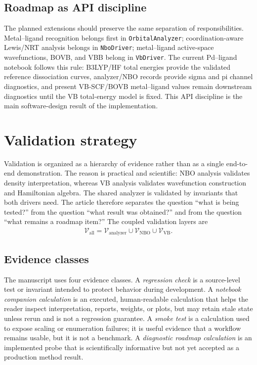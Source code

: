 \documentclass[11pt]{article}
\begin{document}
\subsection{Roadmap as API discipline}

The planned extensions should preserve the same separation of responsibilities.  Metal--ligand recognition belongs first in \texttt{OrbitalAnalyzer}; coordination-aware Lewis/NRT analysis belongs in \texttt{NboDriver}; metal--ligand active-space wavefunctions, BOVB, and VBB belong in \texttt{VbDriver}.  The current Pd--ligand notebook follows this rule: B3LYP/HF total energies provide the validated reference dissociation curves, analyzer/NBO records provide sigma and pi channel diagnostics, and present VB-SCF/BOVB metal--ligand values remain downstream diagnostics until the VB total-energy model is fixed.  This API discipline is the main software-design result of the implementation.

\section{Validation strategy}

Validation is organized as a hierarchy of evidence rather than as a single end-to-end demonstration.  The reason is practical and scientific: NBO analysis validates density interpretation, whereas VB analysis validates wavefunction construction and Hamiltonian algebra.  The shared analyzer is validated by invariants that both drivers need.  The article therefore separates the question ``what is being tested?'' from the question ``what result was obtained?'' and from the question ``what remains a roadmap item?''  The coupled validation layers are
\begin{equation}
\begin{aligned}
	\mathcal{V}_{\mathrm{all}}
	= \mathcal{V}_{\mathrm{analyzer}}
	\cup \mathcal{V}_{\mathrm{NBO}}
	\cup \mathcal{V}_{\mathrm{VB}}.
\end{aligned}
\end{equation}

\subsection{Evidence classes}

The manuscript uses four evidence classes.  A \emph{regression check} is a source-level test or invariant intended to protect behavior during development.  A \emph{notebook companion calculation} is an executed, human-readable calculation that helps the reader inspect interpretation, reports, weights, or plots, but may retain stale state unless rerun and is not a regression guarantee.  A \emph{smoke test} is a calculation used to expose scaling or enumeration failures; it is useful evidence that a workflow remains usable, but it is not a benchmark.  A \emph{diagnostic roadmap calculation} is an implemented probe that is scientifically informative but not yet accepted as a production method result.
\end{document}
